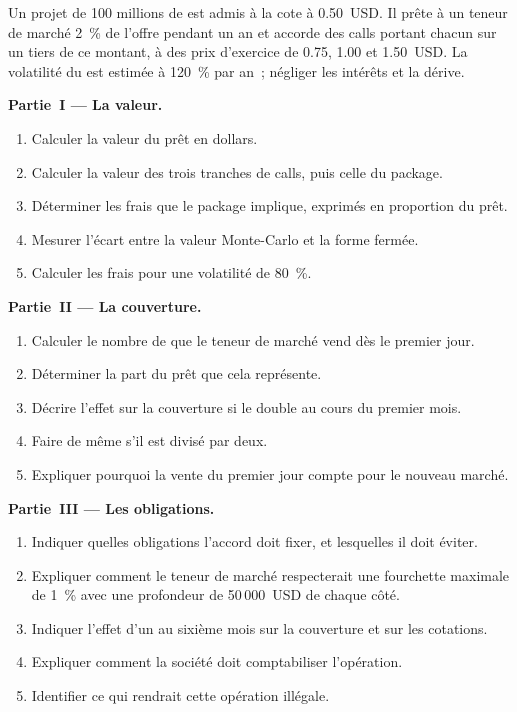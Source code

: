 \begin{problem}\label{pb:m3:the-crypto-trading-business:1}
Un projet de 100 millions de  est admis à la cote à 0.50~USD. Il prête à un teneur de marché 2~\% de l'offre pendant un an et accorde des calls portant chacun sur un tiers de ce montant, à des prix d'exercice
de 0.75, 1.00 et 1.50~USD. La volatilité du  est estimée à 120~\% par an~; négliger les intérêts et la dérive.

\medskip\noindent\textbf{Partie~I --- La valeur.}
\begin{enumerate}
\item Calculer la valeur du prêt en dollars.
\item Calculer la valeur des trois tranches de calls, puis celle du package.
\item Déterminer les frais que le package implique, exprimés en proportion du prêt.
\item Mesurer l'écart entre la valeur Monte-Carlo et la forme fermée.
\item Calculer les frais pour une volatilité de 80~\%.
\end{enumerate}

\medskip\noindent\textbf{Partie~II --- La couverture.}
\begin{enumerate}[resume]
\item Calculer le nombre de  que le teneur de marché vend dès le premier jour.
\item Déterminer la part du prêt que cela représente.
\item Décrire l'effet sur la couverture si le  double au cours du premier mois.
\item Faire de même s'il est divisé par deux.
\item Expliquer pourquoi la vente du premier jour compte pour le nouveau marché.
\end{enumerate}

\medskip\noindent\textbf{Partie~III --- Les obligations.}
\begin{enumerate}[resume]
\item Indiquer quelles obligations l'accord doit fixer, et lesquelles il doit éviter.
\item Expliquer comment le teneur de marché respecterait une fourchette maximale de 1~\% avec une profondeur de 50\,000~USD de chaque côté.
\item Indiquer l'effet d'un  au sixième mois sur la couverture et sur les cotations.
\item Expliquer comment la société doit comptabiliser l'opération.
\item Identifier ce qui rendrait cette opération illégale.
\end{enumerate}


\end{problem}
